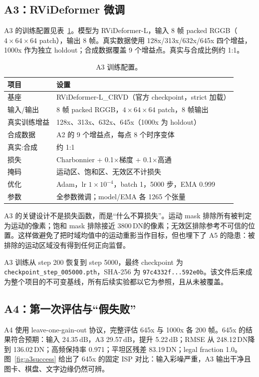 \documentclass[11pt,a4paper,UTF8,fontset=fandol]{ctexart}
\newcommand{\dn}{\ensuremath{\,\mathrm{DN}}}
\newcommand{\db}{\ensuremath{\,\mathrm{dB}}}
\begin{document}
\subsection{A3：RViDeformer 微调}

A3 的训练配置见表~\ref{tab:a3config}。模型为 RViDeformer-L，输入 8 帧 packed RGGB（$4\times64\times64$ patch），输出 8 帧。真实数据使用 128x/313x/632x/645x 四个增益，1000x 作为独立 holdout；合成数据覆盖 9 个增益点。真实与合成比例约 1:1。

\begin{table}[H]
\centering
\small
\caption{A3 训练配置。}
\label{tab:a3config}
\begin{tabular}{ll}
\toprule
项目 & 设置 \\
\midrule
基座 & RViDeformer-L\_CRVD（官方 checkpoint，strict 加载） \\
输入/输出 & 8 帧 packed RGGB，$4\times64\times64$ patch，8 帧输出 \\
真实训练增益 & 128x、313x、632x、645x（1000x 为 holdout） \\
合成数据 & A2 的 9 个增益点，每点 8 个时序变体 \\
真实:合成 & 约 1:1 \\
损失 & Charbonnier + 0.1$\times$梯度 + 0.1$\times$高通 \\
掩码 & 运动区、饱和区、无效区不计损失 \\
优化 & Adam，lr $1\times10^{-4}$，batch 1，5000 步，EMA 0.999 \\
参数 & 全参数微调；model/EMA 各 1265 个张量 \\
\bottomrule
\end{tabular}
\end{table}

A3 的关键设计不是损失函数，而是“什么不算损失”。运动 mask 排除所有被判定为运动的像素；饱和 mask 排除接近 3800\dn 的像素；无效区排除参考不可信的位置。这样做避免了把时域均值中的运动重影当作目标，但也埋下了 A5 的隐患：被排除的运动区域没有得到任何正向监督。

A3 训练从 step 200 恢复到 step 5000，最终 checkpoint 为 \texttt{checkpoint\_step\_005000.pth}，SHA-256 为 \texttt{97c4332f...592e0b}。该文件后来成为整个项目的不可变基线，所有后续实验都以它为参照，且从未被覆盖。

\subsection{A4：第一次评估与“假失败”}

A4 使用 leave-one-gain-out 协议，完整评估 645x 与 1000x 各 200 帧。645x 的结果符合预期：输入 24.35\db，A3 29.57\db，提升 5.22\db；RMSE 从 248.12\dn 降到 136.02\dn；高频保持率 0.971；平坦区残差 83.19\dn；legal fraction 1.0。图~\ref{fig:a3success} 给出了 645x 的固定 ISP 对比：输入彩噪严重，A3 输出干净且图卡、棋盘、文字边缘仍然可辨。
\end{document}
